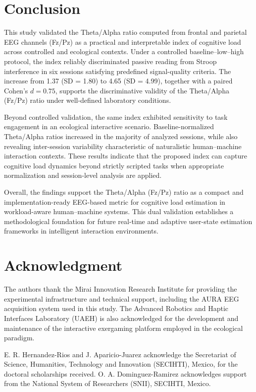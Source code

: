 \documentclass[10pt]{iopart}
\begin{document}
\section{Conclusion}

This study validated the Theta/Alpha ratio computed from frontal and parietal EEG channels (Fz/Pz) as a practical and interpretable index of cognitive load across controlled and ecological contexts. Under a controlled baseline--low--high protocol, the index reliably discriminated passive reading from Stroop interference in six sessions satisfying predefined signal-quality criteria. The increase from 1.37 (SD = 1.80) to 4.65 (SD = 4.99), together with a paired Cohen’s $d = 0.75$, supports the discriminative validity of the Theta/Alpha (Fz/Pz) ratio under well-defined laboratory conditions.

Beyond controlled validation, the same index exhibited sensitivity to task engagement in an ecological interactive scenario. Baseline-normalized Theta/Alpha ratios increased in the majority of analyzed sessions, while also revealing inter-session variability characteristic of naturalistic human--machine interaction contexts. These results indicate that the proposed index can capture cognitive load dynamics beyond strictly scripted tasks when appropriate normalization and session-level analysis are applied.

Overall, the findings support the Theta/Alpha (Fz/Pz) ratio as a compact and implementation-ready EEG-based metric for cognitive load estimation in workload-aware human--machine systems. This dual validation establishes a methodological foundation for future real-time and adaptive user-state estimation frameworks in intelligent interaction environments.



\section*{Acknowledgment}
The authors thank the Mirai Innovation Research Institute for providing the experimental infrastructure and technical support, including the AURA EEG acquisition system used in this study. The Advanced Robotics and Haptic Interfaces Laboratory (UAEH) is also acknowledged for the development and maintenance of the interactive exergaming platform employed in the ecological paradigm.

E. R. Hernandez-Rios and J. Aparicio-Juarez acknowledge the Secretariat of Science, Humanities, Technology and Innovation (SECIHTI), Mexico, for the doctoral scholarships received. O. A. Dominguez-Ramirez acknowledges support from the National System of Researchers (SNII), SECIHTI, Mexico.
\end{document}
